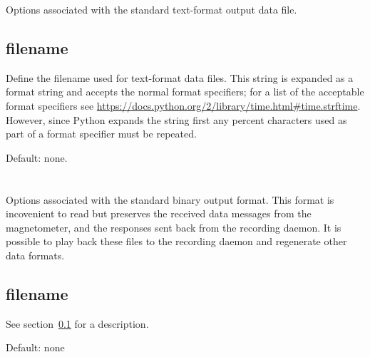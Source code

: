 Options associated with the standard text-format output data file.

\subsection{filename}
\label{sec:config-data-filename}
Define the filename used for text-format data files. This string is
expanded as a  format string and accepts the normal
 format specifiers; for a list of the acceptable format
specifiers see
\url{https://docs.python.org/2/library/time.html#time.strftime}. However,
since Python expands the string first any percent characters used as
part of a  format specifier must be repeated.

Default: none.\\

\section{\code{[awpacket]}}
Options associated with the standard binary output format. This format
is incovenient to read but preserves the received data messages from
the magnetometer, and the responses sent back from the recording
daemon. It is possible to play back these files to the recording
daemon and regenerate other data formats.

\subsection{filename}

See section~\ref{sec:config-data-filename} for a description.

Default: none\\

